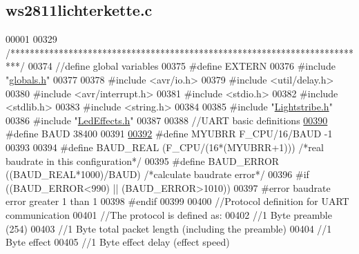 \hypertarget{ws2811lichterkette_8c_source}{}\subsection{ws2811lichterkette.\+c}

\begin{DoxyCode}
00001 
00329 \textcolor{comment}{/**************************************************************************/}
00374 \textcolor{comment}{//define global variables}
00375 \textcolor{preprocessor}{#define EXTERN}
00376 \textcolor{preprocessor}{#include "\hyperlink{globals_8h}{globals.h}"}
00377 
00378 \textcolor{preprocessor}{#include <avr/io.h>}
00379 \textcolor{preprocessor}{#include <util/delay.h>}
00380 \textcolor{preprocessor}{#include <avr/interrupt.h>}
00381 \textcolor{preprocessor}{#include <stdio.h>}      
00382 \textcolor{preprocessor}{#include <stdlib.h>}    
00383 \textcolor{preprocessor}{#include <string.h>}
00384 
00385 \textcolor{preprocessor}{#include "\hyperlink{_lightstribe_8h}{Lightstribe.h}"}
00386 \textcolor{preprocessor}{#include "\hyperlink{_led_effects_8h}{LedEffects.h}"}
00387 
00388 \textcolor{comment}{//UART basic definitions}
\hypertarget{ws2811lichterkette_8c_source_l00390}{}\hyperlink{ws2811lichterkette_8c_a62634036639f88eece6fbf226b45f84b}{00390} \textcolor{comment}{}\textcolor{preprocessor}{#define BAUD 38400  }
00391 
\hypertarget{ws2811lichterkette_8c_source_l00392}{}\hyperlink{ws2811lichterkette_8c_a711e9130c825a7269c8c87dbb57a85e0}{00392} \textcolor{preprocessor}{#define MYUBRR F\_CPU/16/BAUD -1}
00393 
00394 \textcolor{preprocessor}{#define BAUD\_REAL (F\_CPU/(16*(MYUBRR+1)))       }\textcolor{comment}{/*real baudrate in this configuration*/}\textcolor{preprocessor}{}
00395 \textcolor{preprocessor}{#define BAUD\_ERROR ((BAUD\_REAL*1000)/BAUD)      }\textcolor{comment}{/*calculate baudrate error*/}\textcolor{preprocessor}{    }
00396 \textcolor{preprocessor}{#if ((BAUD\_ERROR<990) || (BAUD\_ERROR>1010))}
00397 \textcolor{preprocessor}{    #error baudrate error greater 1%
       than 1%
00398 \textcolor{preprocessor}{#endif}
00399 
00400 \textcolor{comment}{//Protocol definition for UART communication}
00401 \textcolor{comment}{//The protocol is defined as:}
00402 \textcolor{comment}{//1 Byte preamble (254)}
00403 \textcolor{comment}{//1 Byte total packet length (including the preamble)}
00404 \textcolor{comment}{//1 Byte effect}
00405 \textcolor{comment}{//1 Byte effect delay (effect speed)}
}
\end{DoxyCode}
